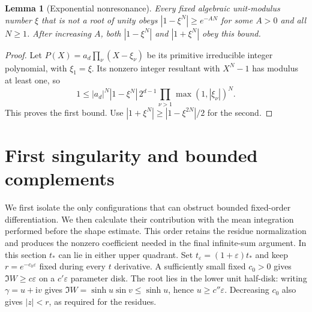 \documentclass[11pt]{article}
\numberwithin{equation}{section}
\newtheorem{lemma}[theorem]{Lemma}
\theoremstyle{definition}
\newcommand{\ii}{\mathrm i}
\newcommand{\eps}{\varepsilon}
\begin{document}
\begin{lemma}[Exponential nonresonance]\label{lem:resultant}
Every fixed algebraic unit-modulus number $\xi$ that is not a root
of unity obeys $|1-\xi^N|\ge e^{-AN}$ for some $A>0$ and all
$N\ge1$. After increasing $A$, both $|1-\xi^N|$ and
$|1+\xi^N|$ obey this bound.
\end{lemma}
\begin{proof}
Let $P(X)=a_d\prod_\nu(X-\xi_\nu)$ be its primitive irreducible
integer polynomial, with $\xi_1=\xi$. Its nonzero integer
resultant with $X^N-1$ has modulus at least one, so
\[
 1\le |a_d|^N|1-\xi^N|\,2^{d-1}
        \prod_{\nu>1}\max(1,|\xi_\nu|)^N.
\]
This proves the first bound. Use
$|1+\xi^N|\ge |1-\xi^{2N}|/2$ for the second.
\end{proof}

\section{First singularity and bounded complements}\label{sec:first}

We first isolate the only configurations that can obstruct bounded
fixed-order differentiation. We then calculate their contribution with
the mean integration performed before the shape estimate. This order
retains the residue normalization and produces the nonzero coefficient
needed in the final infinite-sum argument.
In this section $t_*$ can lie in either upper quadrant. Set
$t_\eps=(1+\eps)t_*$ and keep $r=e^{-c_0\eps}$ fixed during
every $t$ derivative. A sufficiently small fixed $c_0>0$ gives
$\Im W\ge c\eps$ on a $c'\eps$ parameter disk. The root lies
in the lower unit half-disk: writing $\gamma=u+\ii v$ gives
$\Im W=\sinh u\sin v\le\sinh u$, hence $u\ge c''\eps$.
Decreasing $c_0$ also gives $|z|<r$, as required for the residues.
\end{document}
